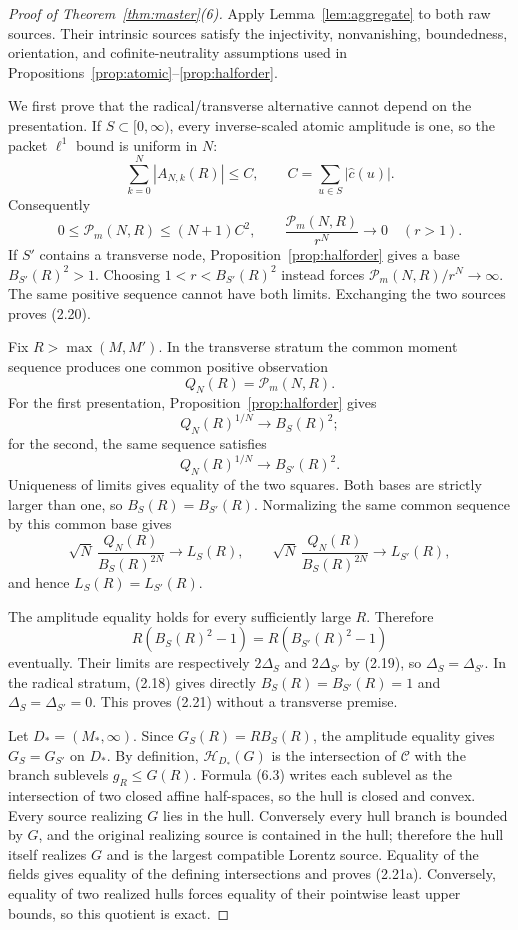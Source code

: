 \documentclass[11pt]{article}
\theoremstyle{remark}
\begin{document}
\begin{proof}[Proof of Theorem~\ref{thm:master}(6)]
Apply Lemma~\ref{lem:aggregate} to both raw sources.  Their intrinsic sources satisfy the
injectivity, nonvanishing, boundedness, orientation, and cofinite-neutrality assumptions used in
Propositions~\ref{prop:atomic}--\ref{prop:halforder}.

We first prove that the radical/transverse alternative cannot depend on the presentation.  If
$S\subset[0,\infty)$, every inverse-scaled atomic amplitude is one, so the packet $\ell^1$ bound
is uniform in $N$:
\[
 \sum_{k=0}^N|A_{N,k}(R)|\le C,
 \qquad C=\sum_{u\in S}|\widehat c(u)|.
\]
Consequently
\[
 0\le \mathcal P_m(N,R)\le (N+1)C^2,
 \qquad \frac{\mathcal P_m(N,R)}{r^N}\longrightarrow0
 \quad(r>1).
\]
If $S'$ contains a transverse node, Proposition~\ref{prop:halforder} gives a base
$B_{S'}(R)^2>1$.  Choosing $1<r<B_{S'}(R)^2$ instead forces
$\mathcal P_m(N,R)/r^N\to\infty$.  The same positive sequence cannot have both limits.  Exchanging
the two sources proves (2.20).

Fix $R>\max(M,M')$.  In the transverse stratum the common moment sequence produces one common
positive observation
\[
 Q_N(R)=\mathcal P_m(N,R).
\]
For the first presentation, Proposition~\ref{prop:halforder} gives
\[
 Q_N(R)^{1/N}\longrightarrow B_S(R)^2;
\]
for the second, the same sequence satisfies
\[
 Q_N(R)^{1/N}\longrightarrow B_{S'}(R)^2.
\]
Uniqueness of limits gives equality of the two squares.  Both bases are strictly larger than one,
so $B_S(R)=B_{S'}(R)$.  Normalizing the same common sequence by this common base gives
\[
 \sqrt N\,\frac{Q_N(R)}{B_S(R)^{2N}}\longrightarrow L_S(R),
 \qquad
 \sqrt N\,\frac{Q_N(R)}{B_S(R)^{2N}}\longrightarrow L_{S'}(R),
\]
and hence $L_S(R)=L_{S'}(R)$.

The amplitude equality holds for every sufficiently large $R$.  Therefore
\[
 R(B_S(R)^2-1)=R(B_{S'}(R)^2-1)
\]
eventually.  Their limits are respectively $2\Delta_S$ and $2\Delta_{S'}$ by (2.19), so
$\Delta_S=\Delta_{S'}$.  In the radical stratum, (2.18) gives directly
$B_S(R)=B_{S'}(R)=1$ and $\Delta_S=\Delta_{S'}=0$.  This proves (2.21) without a transverse
premise.

Let $D_*=(M_*,\infty)$.  Since $G_S(R)=RB_S(R)$, the amplitude equality gives
$G_S=G_{S'}$ on $D_*$.  By definition, $\mathcal H_{D_*}(G)$ is the intersection of
$\mathcal C$ with the branch sublevels $g_R\le G(R)$.  Formula (6.3) writes each sublevel as the
intersection of two closed affine half-spaces, so the hull is closed and convex.  Every source
realizing $G$ lies in the hull.  Conversely every hull branch is bounded by $G$, and the original
realizing source is contained in the hull; therefore the hull itself realizes $G$ and is the
largest compatible Lorentz source.  Equality of the fields gives equality of the defining
intersections and proves (2.21a).  Conversely, equality of two realized hulls forces equality of
their pointwise least upper bounds, so this quotient is exact.


\end{proof}
\end{document}
